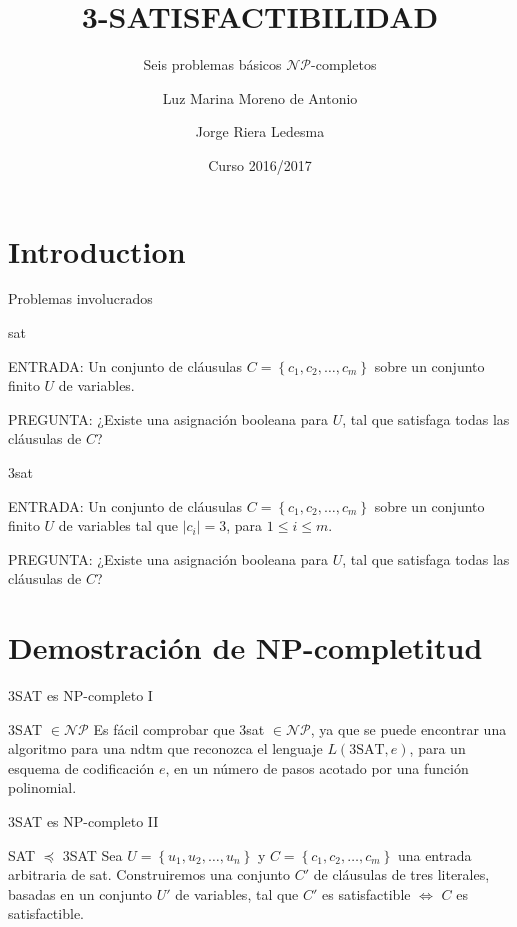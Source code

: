 \documentclass[10pt, mathserif, profesionalfont]{beamer}
\title{3-SATISFACTIBILIDAD}
\subtitle{Seis problemas básicos $\mathcal{NP}$-completos}
\author{Luz Marina Moreno de Antonio \and Jorge Riera Ledesma}
\institute[ULL]{Universidad de La Laguna} %
\date{Curso 2016/2017}
\begin{document}
\begin{frame}
  \titlepage
\end{frame}



\section{Introduction}


\begin{frame}{Problemas involucrados}
    
\begin{block}{\gls{sat}}
{\small 
\noindent ENTRADA: Un conjunto de cláusulas $C=\left \{c_1, c_2, \dots, c_m \right \}$ sobre un conjunto finito $U$ de variables.

\noindent PREGUNTA: ¿Existe una asignación booleana para $U$, tal que satisfaga todas las cláusulas de $C$? 
}
\end{block}

\begin{block}{\gls{3sat}}
{\small
\noindent ENTRADA: Un conjunto de cláusulas $C=\left \{c_1, c_2, \dots, c_m \right \}$ sobre un conjunto finito $U$ de variables tal que $|c_i|=3$, para $1\le i \le m$.

\noindent PREGUNTA: ¿Existe una asignación booleana para $U$, tal que satisfaga todas las cláusulas de $C$? 
}
\end{block}


\end{frame}


\section{Demostración de NP-completitud}

\begin{frame}{3SAT es NP-completo I}
    
\begin{block}{3SAT $\in \mathcal{NP}$}    
Es fácil comprobar que \gls{3sat}	$\in \mathcal{NP}$, ya que se puede encontrar una algoritmo para una \gls{ndtm} que reconozca el lenguaje $L(\mbox{3SAT},e)$, para un esquema de codificación $e$, en un número de pasos acotado por una función polinomial.

\end{block}

\end{frame}

\begin{frame}{3SAT es NP-completo II}
    
\begin{block}{SAT $\preceq$ 3SAT}    
Sea $U=\left \{u_1, u_2, \dots, u_n  \right\}$  y $C=\left \{c_1, c_2, \dots, c_m \right \}$ una entrada arbitraria de \gls{sat}. Construiremos una conjunto $C'$ de cláusulas de tres literales, basadas en un conjunto $U'$ de variables, tal que $C'$ es satisfactible $\Leftrightarrow$ $C$ es satisfactible.
\end{block}

\end{frame}
\end{document}
